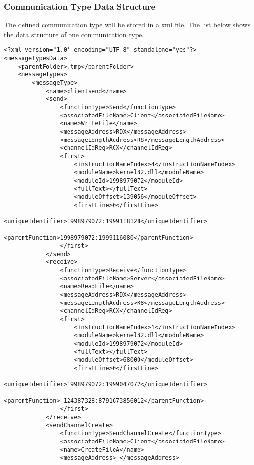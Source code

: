 \documentclass[paper=a4, fontsize=11pt]{scrartcl}
\numberwithin{equation}{section}		%
\numberwithin{figure}{section}			%
\numberwithin{table}{section}				%
\begin{document}
\subsubsection{Communication Type Data Structure}
The defined communication type will be stored in a xml file. The list below shows the data structure of one communication type. 
\begin{lstlisting}
<?xml version="1.0" encoding="UTF-8" standalone="yes"?>
<messageTypesData>
    <parentFolder>.tmp</parentFolder>
    <messageTypes>
        <messageType>
            <name>clientsend</name>
            <send>
                <functionType>Send</functionType>
                <associatedFileName>Client</associatedFileName>
                <name>WriteFile</name>
                <messageAddress>RDX</messageAddress>
                <messageLengthAddress>R8</messageLengthAddress>
                <channelIdReg>RCX</channelIdReg>
                <first>
                    <instructionNameIndex>4</instructionNameIndex>
                    <moduleName>kernel32.dll</moduleName>
                    <moduleId>1998979072</moduleId>
                    <fullText></fullText>
                    <moduleOffset>139056</moduleOffset>
                    <firstLine>0</firstLine>
                    <uniqueIdentifier>1998979072:1999118128</uniqueIdentifier>
                    <parentFunction>1998979072:1999116080</parentFunction>
                </first>
            </send>
            <receive>
                <functionType>Receive</functionType>
                <associatedFileName>Server</associatedFileName>
                <name>ReadFile</name>
                <messageAddress>RDX</messageAddress>
                <messageLengthAddress>R8</messageLengthAddress>
                <channelIdReg>RCX</channelIdReg>
                <first>
                    <instructionNameIndex>1</instructionNameIndex>
                    <moduleName>kernel32.dll</moduleName>
                    <moduleId>1998979072</moduleId>
                    <fullText></fullText>
                    <moduleOffset>68000</moduleOffset>
                    <firstLine>0</firstLine>
                    <uniqueIdentifier>1998979072:1999047072</uniqueIdentifier>
                    <parentFunction>-124387328:8791673856012</parentFunction>
                </first>
            </receive>
            <sendChannelCreate>
                <functionType>SendChannelCreate</functionType>
                <associatedFileName>Client</associatedFileName>
                <name>CreateFileA</name>
                <messageAddress>-</messageAddress>

\end{lstlisting}
\end{document}
